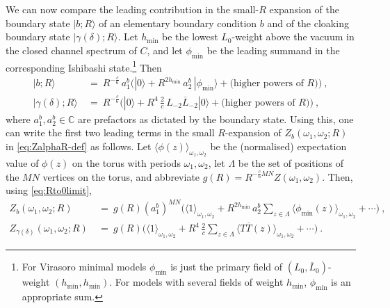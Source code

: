 \documentclass[11pt,a4paper]{article}
\numberwithin{equation}{section}
\def\ket#1{|{#1}\rangle}
\begin{document}
We can now compare the leading contribution in the small-$R$ expansion of the boundary state $|b;R\rangle$ of an elementary boundary condition $b$ and of the cloaking boundary state $|\gamma(\delta);R\rangle$. Let $h_\mathrm{min}$ be the lowest $L_0$-weight above the vacuum in the closed channel spectrum of $C$, and let $\phi_\mathrm{min}$ be the leading summand in the corresponding Ishibashi state.\footnote{
	For Virasoro minimal models $\phi_\mathrm{min}$ is just the primary field of $(L_0,\overline L_0)$-weight $(h_\mathrm{min},h_\mathrm{min})$. For models with several	fields of weight $h_\text{min}$, $\phi_\mathrm{min}$ is an appropriate sum.}
Then
%
\begin{align}
\ket{b;R} ~&=~ R^{- \frac c6}\, a^b_1 \Big(  |0\rangle + R^{2 h_\mathrm{min}} \, a_2^b\,|\phi_\mathrm{min}\rangle + \text{(higher powers of $R$)} \Big)~,
\nonumber \\
\ket{\gamma(\delta);R} ~&=~ 
R^{- \frac c6} \Big( |0\rangle + R^{4} \,\tfrac2c\, L_{-2}\overline L_{-2}|0\rangle + \text{(higher powers of $R$)} \Big) ~,
\label{eq:bnd-state-leading-contrib}
\end{align}
%
where $a^b_1, a_2^b \in \mathbb{C}$ are prefactors as dictated by the boundary state.
Using this, one can write the first two leading terms in the small $R$-expansion of $Z_b(\omega_1,\omega_2;R)$ in \eqref{eq:ZalphaR-def} as follows. Let $\langle \phi(z) \rangle_{\omega_1,\omega_2}$ be the (normalised) expectation value of $\phi(z)$ on the torus with periods $\omega_1,\omega_2$, let $\Lambda$ be the set of positions of the $MN$ vertices on the torus, and abbreviate $g(R) = R^{-\frac{c}{6}MN} Z(\omega_1,\omega_2)$. Then, using \eqref{eq:Rto0limit},
%
\begin{align}
Z_b(\omega_1,\omega_2;R) ~&=~ g(R) (a^b_1)^{MN} \Big( \langle 1 \rangle_{\omega_1,\omega_2} + R^{2 h_\mathrm{min}} \, a_2^b \sum_{z \in \Lambda} \langle \phi_\mathrm{min}(z) \rangle_{\omega_1,\omega_2} + \cdots \Big) ~,
\nonumber \\
Z_{\gamma(\delta)}(\omega_1,\omega_2;R) ~&=~ g(R) \Big( \langle 1 \rangle_{\omega_1,\omega_2} + R^{4} \, \tfrac2c \sum_{z \in \Lambda} \langle T\overline T(z) \rangle_{\omega_1,\omega_2} + \cdots \Big)~.
\label{eq:Z-hole-smallR-expansion}
\end{align}
\end{document}
